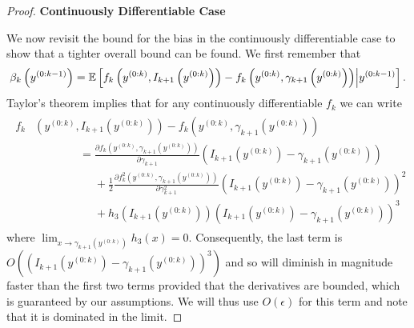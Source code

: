 \begin{proof}
\vspace{15pt}
\noindent\textbf{\large Continuously Differentiable Case}
\vspace{5pt}

\noindent We now revisit the bound for the bias in the continuously differentiable case to
show that a tighter overall bound can be found.  We first remember that
\[
\beta_k \left(y^{(0:k-1)} \right) =
\mathbb{E} \left[f_k\left(y^{(0:k)}, I_{k+1}\left(y^{(0:k)}\right)\right)
- f_k\left(y^{(0:k)}, \gamma_{k+1}\left(y^{(0:k)}\right)\right)
\middle|  y^{(0:k-1)} \right].
\]
Taylor's theorem implies that for any continuously differentiable $f_k$ we can write
\begin{align}
	\begin{split}
f_k&\left(y^{(0:k)}, I_{k+1}\left(y^{(0:k)}\right)\right)
	- f_k\left(y^{(0:k)}, \gamma_{k+1}\left(y^{(0:k)}\right)\right) \\
	&\quad\quad\quad\quad= \frac{\partial f_k \left(y^{(0:k)},\gamma_{k+1}(y^{(0:k)})\right)}{\partial \gamma_{k+1}}
		\left(I_{k+1}\left(y^{(0:k)}\right) - \gamma_{k+1}\left(y^{(0:k)}\right)\right) \\
	&\quad\quad\quad\quad\phantom{=}+\frac{1}{2}
	\frac{\partial f_k^{2} \left(y^{(0:k)},\gamma_{k+1}(y^{(0:k)})\right)}{\partial \gamma_{k+1}^{2}}
	\left(I_{k+1}\left(y^{(0:k)}\right) - \gamma_{k+1}\left(y^{(0:k)}\right)\right)^{2} \\
	&\quad\quad\quad\quad\phantom{=}+h_3\left(I_{k+1}\left(y^{(0:k)}\right) \right) 
	\left(I_{k+1}\left(y^{(0:k)}\right) - \gamma_{k+1}\left(y^{(0:k)}\right)\right)^{3}
	\end{split}
\end{align}
where $\lim_{x\rightarrow\gamma_{k+1}\left(y^{(0:k)}\right)}h_3(x)=0$.  Consequently, the
last term is $O\left(\left(I_{k+1}\left(y^{(0:k)}\right) - \gamma_{k+1}\left(y^{(0:k)}\right)\right)^{3}\right)$
and so will diminish in magnitude faster than the first two terms provided that the derivatives are
bounded, which is guaranteed by our assumptions.  We will thus use $O(\epsilon)$ for this term and note that
it is dominated in the limit.


\end{proof}

